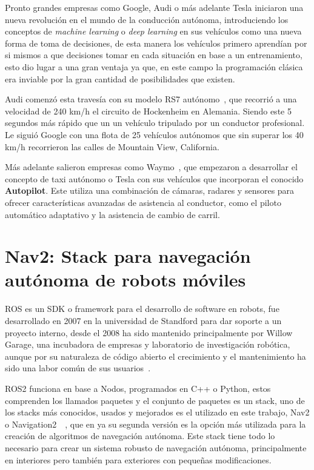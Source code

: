 Pronto grandes empresas como Google, Audi o más adelante Tesla iniciaron una nueva revolución en el mundo de la conducción autónoma, 
introduciendo los conceptos de \textit{machine learning} o \textit{deep learning} en sus vehículos como una nueva forma de toma de 
decisiones, de esta manera los vehículos primero aprendían por si mismos a que decisiones tomar en cada situación en base a un entrenamiento, 
esto dio lugar a una gran ventaja ya que, en este campo la programación clásica era inviable por la gran cantidad de posibilidades que existen.

Audi comenzó esta travesía con su modelo RS7 autónomo~\cite{audirs715}, que recorrió a una velocidad de 240 km/h el circuito de Hockenheim en Alemania. 
Siendo este 5 segundos más rápido que un un vehículo tripulado por un conductor profesional. Le siguió Google con una flota de 25 
vehículos autónomos que sin superar los 40 km/h recorrieron las calles de Mountain View, California.

Más adelante salieron empresas como Waymo~\cite{waymo24}, que empezaron a desarrollar el concepto de taxi autónomo o Tesla con sus vehículos que 
incorporan el conocido \textbf{Autopilot}. Este utiliza una combinación de cámaras, radares y sensores para ofrecer características 
avanzadas de asistencia al conductor, como el piloto automático adaptativo y la asistencia de cambio de carril.

\section{Nav2: Stack para navegación autónoma de robots móviles}
ROS es un SDK o framework para el desarrollo de software en robots, fue desarrollado en 2007 en la universidad de Standford para 
dar soporte a un proyecto interno, desde el 2008 ha sido mantenido principalmente por Willow Garage, una incubadora de empresas y 
laboratorio de investigación robótica, aunque por su naturaleza de código abierto el crecimiento y el mantenimiento ha sido una labor 
común de sus usuarios~\cite{ros2}.

ROS2 funciona en base a Nodos, programados en C++ o Python, estos comprenden los llamados paquetes y el conjunto de paquetes es un stack, 
uno de los stacks más conocidos, usados y mejorados es el utilizado en este trabajo, Nav2 o Navigation2~\cite{nav2}~, que en ya su segunda 
versión es la opción más utilizada para la creación de algoritmos de navegación autónoma.
Este stack tiene todo lo necesario para crear un sistema robusto de navegación autónoma, principalmente en interiores pero también para exteriores con pequeñas modificaciones.

